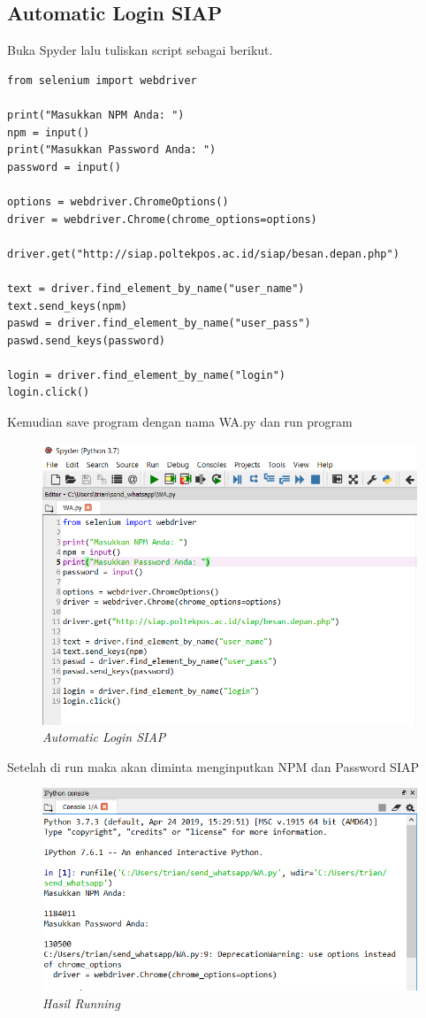 \subsection{Automatic Login SIAP}
Buka Spyder lalu tuliskan script sebagai berikut.
\begin{verbatim}
from selenium import webdriver

print("Masukkan NPM Anda: ")
npm = input()
print("Masukkan Password Anda: ")
password = input()

options = webdriver.ChromeOptions()
driver = webdriver.Chrome(chrome_options=options)

driver.get("http://siap.poltekpos.ac.id/siap/besan.depan.php")

text = driver.find_element_by_name("user_name")
text.send_keys(npm)
paswd = driver.find_element_by_name("user_pass")
paswd.send_keys(password)

login = driver.find_element_by_name("login")
login.click()
\end{verbatim}
Kemudian save program dengan nama WA.py dan run program
\begin{figure}[H]
    \centering
    \includegraphics[scale=0.5]{figures/login}
    \caption{\textit{Automatic Login SIAP}}
    \label{Automatic1}
\end{figure}
Setelah di run maka akan diminta menginputkan NPM dan Password SIAP
\begin{figure}[H]
    \centering
    \includegraphics[scale=0.5]{figures/running}
    \caption{\textit{Hasil Running}}
    \label{Automatic2}
\end{figure}
